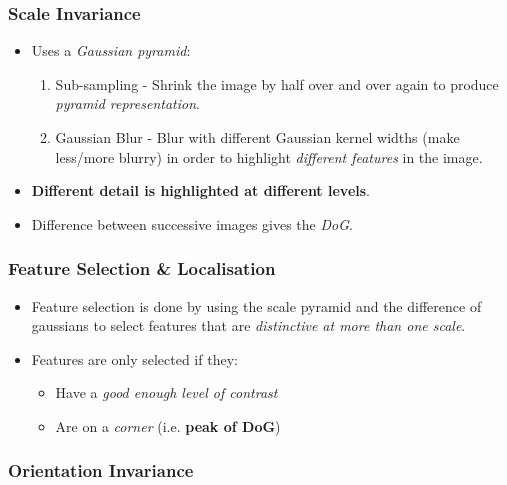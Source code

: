 \documentclass[english, 10pt]{article}
\begin{document}
\subsubsection{Scale Invariance}\label{scale-invariance}

\begin{itemize}
\item
  Uses a \emph{Gaussian pyramid}:

  \begin{enumerate}
  \def\labelenumi{\arabic{enumi}.}
  \itemsep1pt\parskip0pt
  \item
    Sub-sampling - Shrink the image by half over and over again to
    produce \emph{pyramid representation}.
  \item
    Gaussian Blur - Blur with different Gaussian kernel widths (make
    less/more blurry) in order to highlight \emph{different features} in
    the image.
  \end{enumerate}
\item
  \textbf{Different detail is highlighted at different levels}.
\item
  Difference between successive images gives the \emph{DoG}.
\end{itemize}

\subsubsection{Feature Selection \&
Localisation}\label{feature-selection-localisation}

\begin{itemize}
\item
  Feature selection is done by using the scale pyramid and the
  difference of gaussians to select features that are \emph{distinctive
  at more than one scale}.
\item
  Features are only selected if they:

  \begin{itemize}
  \itemsep1pt\parskip0pt
  \item
    Have a \emph{good enough level of contrast}
  \item
    Are on a \emph{corner} (i.e. \textbf{peak of DoG})
  \end{itemize}
\end{itemize}

\subsubsection{Orientation Invariance}\label{orientation-invariance}
\end{document}
